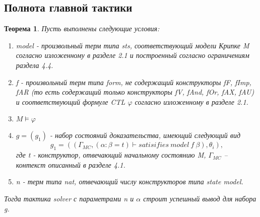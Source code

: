 \documentclass[12pt]{article}
\newtheorem{theorem}{Теорема}
\begin{document}
\subsection{Полнота главной тактики}
\begin{theorem}
Пусть выполнены следующие условия:
\begin{enumerate}
    \item[1.] model - произвольный терм типа \textit{sts}, соответствующий модели Крипке M согласно изложенному в разделе 2.1 и построенный согласно ограничениям раздела 4.4.
    \item[2.] f - произвольный терм типа form, не содержащий конструкторы fF, fImp, fAR (то есть содержащий только конструкторы fV, fAnd, fOr, fAX, fAU) и соответствующий формуле CTL $\varphi$ согласно изложенному в разделе 2.1.
    \item[3.] $M \models \varphi$
    \item[4.] $g = (g_1)$ - набор состояний доказательства, имеющий следующий вид 
    $$g_1 = ((\Gamma_{MC}, (\alpha: \beta=t) \vdash satisifies\ model\ f\ \beta), \theta_i),$$ где t - конструктор, 
    отвечающий начальному состоянию M, $\Gamma_{MC}$ -- контекст описанный в разделе 4.1.
    \item[5.] n - терм типа nat, отвечающий числу конструкторов типа state model. 
\end{enumerate}

Тогда тактика solver с параметрами n и $\alpha$ строит успешный вывод для набора g.





\end{theorem}
\end{document}
